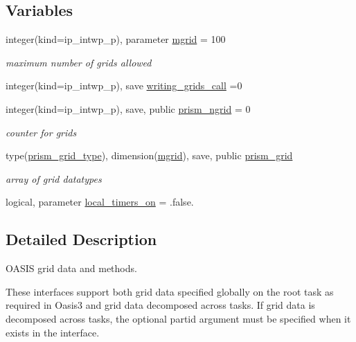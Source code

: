 \subsection*{Variables}
\begin{DoxyCompactItemize}
\item 
integer(kind=ip\+\_\+intwp\+\_\+p), parameter \hyperlink{namespacemod__oasis__grid_a9df267c5d7acbb73eb35d6aaf10ab59e}{mgrid} = 100
\begin{DoxyCompactList}\small\item\em maximum number of grids allowed \end{DoxyCompactList}\item 
integer(kind=ip\+\_\+intwp\+\_\+p), save \hyperlink{namespacemod__oasis__grid_a587c160986cc015e4367b1cca13babfb}{writing\+\_\+grids\+\_\+call} =0
\item 
integer(kind=ip\+\_\+intwp\+\_\+p), save, public \hyperlink{namespacemod__oasis__grid_ad6e65eb9872825ac98db6ce1f7dcd618}{prism\+\_\+ngrid} = 0
\begin{DoxyCompactList}\small\item\em counter for grids \end{DoxyCompactList}\item 
type(\hyperlink{structmod__oasis__grid_1_1prism__grid__type}{prism\+\_\+grid\+\_\+type}), dimension(\hyperlink{namespacemod__oasis__grid_a9df267c5d7acbb73eb35d6aaf10ab59e}{mgrid}), save, public \hyperlink{namespacemod__oasis__grid_a43b75282e77fd687bd7173f4f78abcb1}{prism\+\_\+grid}
\begin{DoxyCompactList}\small\item\em array of grid datatypes \end{DoxyCompactList}\item 
logical, parameter \hyperlink{namespacemod__oasis__grid_a88908301f4dba06278e75e79f90b1155}{local\+\_\+timers\+\_\+on} = .false.
\end{DoxyCompactItemize}


\subsection{Detailed Description}
O\+A\+S\+IS grid data and methods. 

These interfaces support both grid data specified globally on the root task as required in Oasis3 and grid data decomposed across tasks. If grid data is decomposed across tasks, the optional partid argument must be specified when it exists in the interface. 

